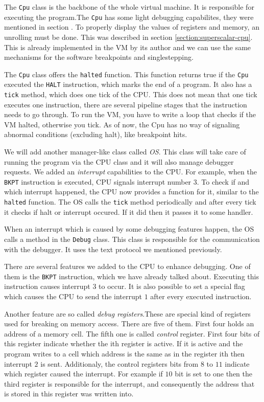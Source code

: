The \texttt{Cpu} class is the backbone of the whole virtual machine. It is
responsible for executing the program.The \texttt{Cpu} has some light debugging
capabilites, they were mentioned in section . To properly display the
values of registers and memory, an unrolling must be done. This was described
in section \ref{section:superscalar-cpu}. This is already implemented in the VM
by its author and we can use the same mechanisms for the software breakpoints
and singlestepping.

The \texttt{Cpu} class offers the \texttt{halted} function. This function
returns true if the \texttt{Cpu} executed the \texttt{HALT} instruction, which
marks the end of a program. It also has a \texttt{tick} method, which does one
tick of the CPU. This does not mean that one tick executes one instruction,
there are several pipeline stages that the instruction needs to go through. To
run the VM, you have to write a loop that checks if the VM halted, otherwise
you tick. As of now, the Cpu has no way of signaling abnormal conditions
(excluding halt), like breakpoint hits.

We will add another manager-like class called \textit{OS}. This class will take
care of running the program via the CPU class and it will also manage debugger
requests. We added an \textit{interrupt} capabilities to the CPU. For example,
when the \texttt{BKPT} instruction is executed, CPU signals interrupt number
$3$. To check if and which interrupt happened, the CPU now provides a function
for it, similar to the \texttt{halted} function. The OS calls the \texttt{tick}
method periodically and after every tick it checks if halt or interrupt
occured. If it did then it passes it to some handler.

When an interrupt which is caused by some debugging features happen, the OS
calls a method in the \texttt{Debug} class. This class is responsible for the
communication with the debugger. It uses the text protocol we mentioned
previously.

There are several features we added to the CPU to enhance debugging. One of them
is the \texttt{BKPT} instruction, which we have already talked about. Executing
this instruction causes interrupt $3$ to occur. It is also possible to set a
special flag which causes the CPU to send the interrupt $1$ after every executed
instruction. 

Another feature are so called \textit{debug registers}.These are special kind
of registers used for breaking on memory access. There are five of them. First
four holds an address of a memory cell. The fifth one is called
\textit{control} register. First four bits of this register indicate whether
the ith register is active. If it is active and the program writes to a cell
which address is the same as in the register ith then interrupt $2$ is sent.
Additionaly, the control registers bits from $8$ to $11$ indicate which
register caused the interrupt. For example if $10$ bit is set to one then the
third register is responsible for the interrupt, and consequently the address
that is stored in this register was written into.

